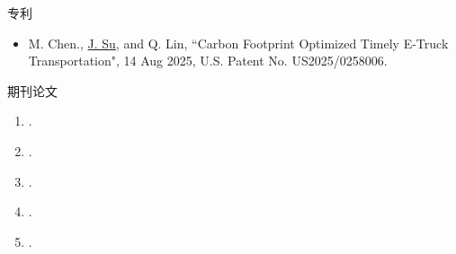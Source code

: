 \documentclass{resume} %
\begin{document}




\begin{rSection}{专利}
    \begin{itemize}
        \item M. Chen., \underline{J. Su}, and Q. Lin, ``Carbon Footprint Optimized Timely E-Truck Transportation", 14 Aug 2025, U.S. Patent No. US2025/0258006.
    \end{itemize}
\end{rSection}
\newpage

\begin{rSection}{期刊论文}
    \begin{enumerate}
        \item {}.
        \item {}.
        \item {}.
        \item {}.
        \item {}.
    \end{enumerate}
\end{rSection}
\end{document}
